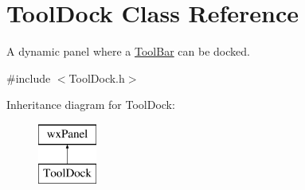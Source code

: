 \hypertarget{class_tool_dock}{}\section{Tool\+Dock Class Reference}
\label{class_tool_dock}


A dynamic panel where a \hyperlink{class_tool_bar}{Tool\+Bar} can be docked.  




{\ttfamily \#include $<$Tool\+Dock.\+h$>$}

Inheritance diagram for Tool\+Dock\+:\begin{figure}[H]
\begin{center}
\leavevmode
\includegraphics[height=2.000000cm]{class_tool_dock}
\end{center}
\end{figure}
